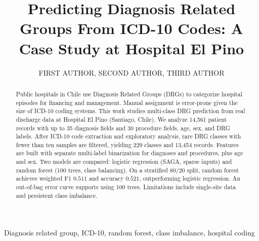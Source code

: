 \documentclass{ieeeaccess}
\begin{document}
\graphicspath{{../figures/}}


\title{Predicting Diagnosis Related Groups From ICD-10 Codes: A Case Study at Hospital El Pino}

\author{\uppercase{First Author},
\uppercase{Second Author},
\uppercase{Third Author}}

\address[1]{Universidad Andr\'es Bello, Santiago, Chile (e-mail: student@unab.cl)}




\begin{abstract}
Public hospitals in Chile use Diagnosis Related Groups (DRGs) to categorize hospital episodes for financing and management. Manual assignment is error-prone given the size of ICD-10 coding systems. This work studies multi-class DRG prediction from real discharge data at Hospital El Pino (Santiago, Chile). We analyze 14{,}561 patient records with up to 35 diagnosis fields and 30 procedure fields, age, sex, and DRG labels. After ICD-10 code extraction and exploratory analysis, rare DRG classes with fewer than ten samples are filtered, yielding 229 classes and 13{,}454 records. Features are built with separate multi-label binarization for diagnoses and procedures, plus age and sex. Two models are compared: logistic regression (SAGA, sparse inputs) and random forest (100 trees, class balancing). On a stratified 80/20 split, random forest achieves weighted F1 $0.511$ and accuracy $0.521$, outperforming logistic regression. An out-of-bag error curve supports using 100 trees. Limitations include single-site data and persistent class imbalance.
\end{abstract}

\begin{keywords}
Diagnosis related group, ICD-10, random forest, class imbalance, hospital coding
\end{keywords}

\titlepgskip=-15pt
\maketitle
\end{document}
